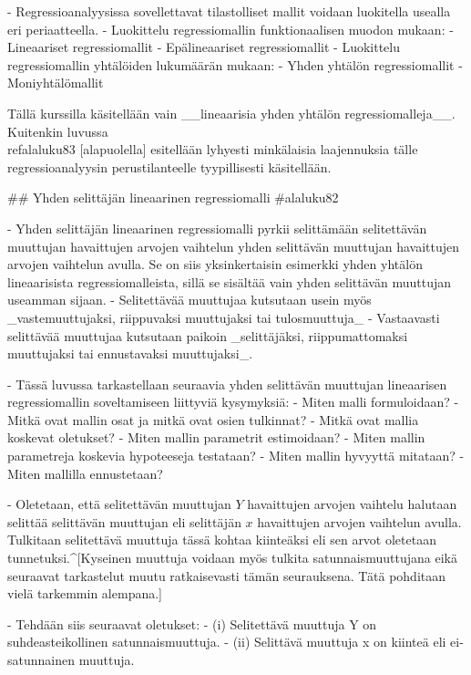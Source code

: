 \documentclass[
]{book}
\begin{document}
\begin{itemize}
- Regressioanalyysissa sovellettavat tilastolliset mallit voidaan luokitella usealla eri periaatteella.
  - Luokittelu regressiomallin funktionaalisen muodon mukaan:
    - Lineaariset regressiomallit
    - Epälineaariset regressiomallit
  - Luokittelu regressiomallin yhtälöiden lukumäärän mukaan:
    - Yhden yhtälön regressiomallit
    - Moniyhtälömallit

Tällä kurssilla käsitellään vain __lineaarisia yhden yhtälön regressiomalleja__. Kuitenkin luvussa \\ref{alaluku83} [alapuolella] esitellään lyhyesti minkälaisia laajennuksia tälle regressioanalyysin perustilanteelle tyypillisesti käsitellään. 

## Yhden selittäjän lineaarinen regressiomalli {#alaluku82}

- Yhden selittäjän lineaarinen regressiomalli pyrkii selittämään selitettävän muuttujan havaittujen arvojen vaihtelun yhden selittävän muuttujan havaittujen arvojen vaihtelun avulla. Se on siis yksinkertaisin esimerkki yhden yhtälön lineaarisista regressiomalleista, sillä se sisältää vain yhden selittävän muuttujan useamman sijaan. 
  - Selitettävää muuttujaa kutsutaan usein myös _vastemuuttujaksi, riippuvaksi muuttujaksi tai tulosmuuttuja_ 
  - Vastaavasti selittävää muuttujaa kutsutaan paikoin _selittäjäksi, riippumattomaksi muuttujaksi tai ennustavaksi muuttujaksi_. 

- Tässä luvussa tarkastellaan seuraavia yhden selittävän muuttujan lineaarisen regressiomallin soveltamiseen liittyviä kysymyksiä:
  - Miten malli formuloidaan?
  - Mitkä ovat mallin osat ja mitkä ovat osien tulkinnat?
  - Mitkä ovat mallia koskevat oletukset?
  - Miten mallin parametrit estimoidaan?
  - Miten mallin parametreja koskevia hypoteeseja testataan?
  - Miten mallin hyvyyttä mitataan?
  - Miten mallilla ennustetaan?

- Oletetaan, että selitettävän muuttujan $Y$ havaittujen arvojen vaihtelu halutaan selittää selittävän muuttujan eli selittäjän $x$ havaittujen arvojen vaihtelun avulla. Tulkitaan selitettävä muuttuja tässä kohtaa kiinteäksi eli sen arvot oletetaan tunnetuksi.^[Kyseinen muuttuja voidaan myös tulkita satunnaismuuttujana eikä seuraavat tarkastelut muutu ratkaisevasti tämän seurauksena. Tätä pohditaan vielä tarkemmin alempana.]

- Tehdään siis seuraavat oletukset:
  - (i) Selitettävä muuttuja Y on suhdeasteikollinen satunnaismuuttuja.
  - (ii) Selittävä muuttuja x on kiinteä eli ei-satunnainen muuttuja.


\end{itemize}
\end{document}
